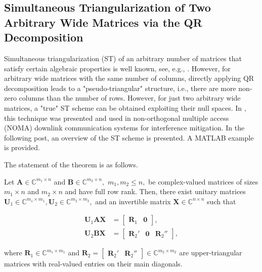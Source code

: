 \subsection{Simultaneous Triangularization of Two Arbitrary Wide Matrices via the QR Decomposition}
\label{ssec:st}

Simultaneous triangularization (ST) of an arbitrary number of matrices that satisfy certain algebraic properties is well known, see, e.g., \cite{Radjavi2012}. However, for arbitrary wide matrices with the same number of columns, directly applying QR decomposition leads to a "pseudo-triangular" structure, i.e., there are more non-zero columns than the number of rows. However, for just two arbitrary wide matrices, a "true" ST scheme can be obtained exploiting their null spaces. In \cite{Krishnamoorthy2021}, this technique was presented and used in non-orthogonal multiple access (NOMA) downlink communication systems for interference mitigation. In the following post, an overview of the ST scheme is presented. A MATLAB example is provided.

The statement of the theorem is as follows.

\begin{theorem}
Let $\boldsymbol{A} \in \mathbb{C}^{m_1\times n}$ and $\boldsymbol{B} \in \mathbb{C}^{m_2\times n},$ $m_1,m_2 \leq n,$ be complex-valued matrices of sizes $m_1\times n$ and $m_2\times n$ and have full row rank. Then, there exist unitary matrices $\boldsymbol{U}_1 \in \mathbb{C}^{m_1\times m_1}, \boldsymbol{U}_2 \in \mathbb{C}^{m_2\times m_2},$ and an invertible matrix $\boldsymbol{X} \in \mathbb{C}^{n\times n}$ such that

\begin{align}\boldsymbol{U}_1\boldsymbol{A}\boldsymbol{X} &= \begin{bmatrix}\boldsymbol{R}_1 & \boldsymbol{0}\end{bmatrix}, \label{eqn:std1}\\\boldsymbol{U}_2\boldsymbol{B}\boldsymbol{X} &= \begin{bmatrix}\boldsymbol{R}_2' & \boldsymbol{0} & \boldsymbol{R}_2''\end{bmatrix}, \label{eqn:std2}\end{align}

where $\boldsymbol{R}_1 \in \mathbb{C}^{m_1\times m_1}$ and $\boldsymbol{R}_2 = \begin{bmatrix}\boldsymbol{R}_2'& \boldsymbol{R}_2''\end{bmatrix} \in \mathbb{C}^{m_2\times m_2}$ are upper-triangular matrices with real-valued entries on their main diagonals.
\end{theorem}

